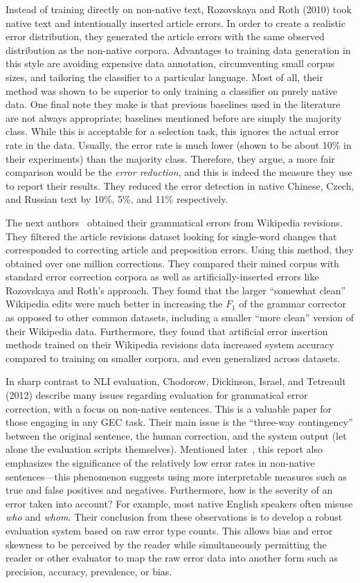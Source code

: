 Instead of training directly on non-native text, Rozovskaya and Roth (2010) took
native text and intentionally inserted article errors. In order to create a
realistic error distribution, they generated the article errors with the same
observed distribution as the non-native corpora. Advantages to training data
generation in this style are avoiding expensive data annotation, circumventing
small corpus sizes, and tailoring the classifier to a particular language. Most
of all, their method was shown to be superior to only training a classifier on
purely native data. One final note they make is that previous baselines used in
the literature are not always appropriate; baselines mentioned before are simply
the majority class. While this is acceptable for a selection task, this ignores
the actual error rate in the data. Usually, the error rate is much lower (shown
to be about 10\% in their experiments) than the majority class. Therefore, they
argue, a more fair comparison would be the \emph{error reduction}, and this is
indeed the measure they use to report their results. They reduced the error
detection in native Chinese, Czech, and Russian text by 10\%, 5\%, and 11\%
respectively.

The next authors~\cite{wiki-rev} obtained their grammatical errors from Wikipedia revisions. They
filtered the article revisions dataset looking for single-word changes that
corresponded to correcting article and preposition errors. Using this method,
they obtained over one million corrections. They compared their mined corpus
with standard error correction corpora as well as artificially-inserted errors
like Rozovskaya and Roth's approach. They found that the larger ``somewhat
clean'' Wikipedia edits were much better in increasing the $F_1$ of the grammar
corrector as opposed to other common datasets, including a smaller ``more
clean'' version of their Wikipedia data. Furthermore, they found that artificial
error insertion methods trained on their Wikipedia revisions data increased
system accuracy compared to training on smaller corpora, and even generalized
across datasets.

In sharp contrast to NLI evaluation, Chodorow, Dickinson, Israel, and Tetreault
(2012) describe many issues
regarding evaluation for grammatical error correction, with a focus on
non-native sentences. This is a valuable paper for those engaging in any GEC
task. Their main issue is the ``three-way contingency'' between the original
sentence, the human correction, and the system output (let alone the evaluation
scripts themselves). Mentioned later~\cite{2013-joint}, this report also
emphasizes the significance of the relatively low error rates in non-native
sentences---this phenomenon suggests using more interpretable measures such as
true and false positives and negatives. Furthermore, how is the severity of an
error taken into account? For example, most native English speakers often misuse
\emph{who} and \emph{whom}. Their conclusion from these observations is to
develop a robust evaluation system based on raw error type counts. This allows
bias and error skewness to be perceived by the reader while simultaneously
permitting the reader or other evaluator to map the raw error data into another
form such as precision, accuracy, prevalence, or bias.

